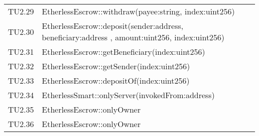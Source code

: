 \begin{longtable}{
		>{\centering}p{}
		>{}p{}}
	TU2.29 &  EtherlessEscrow::withdraw(payee:string, index:uint256)  \tabularnewline
	TU2.30 &  EtherlessEscrow::deposit(sender:address, beneficiary:address , amount:uint256, index:uint256)  \tabularnewline
	TU2.31 &  EtherlessEscrow::getBeneficiary(index:uint256)  \tabularnewline
	TU2.32 &  EtherlessEscrow::getSender(index:uint256)  \tabularnewline
	TU2.33 &  EtherlessEscrow::depositOf(index:uint256)  \tabularnewline
	TU2.34 &  EtherlessSmart::onlyServer(invokedFrom:address)  \tabularnewline
	TU2.35 &  EtherlessEscrow::onlyOwner  \tabularnewline
	TU2.36 &  EtherlessEscrow::onlyOwner  \tabularnewline

\end{longtable}
